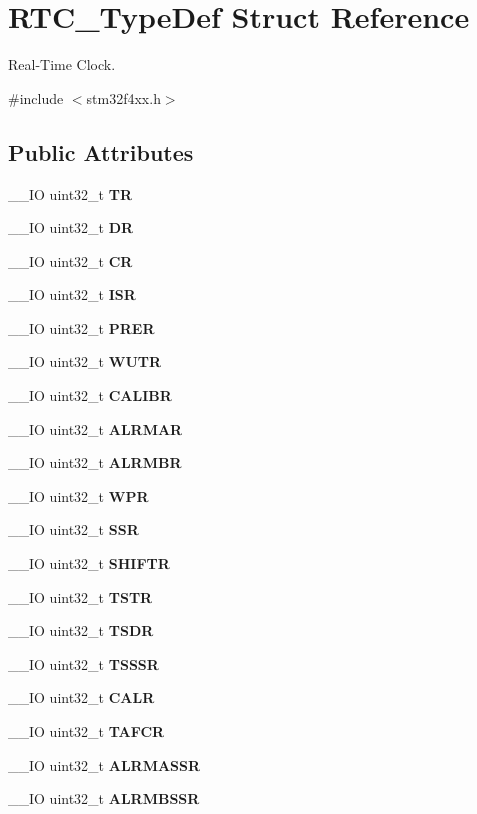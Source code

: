 \section{R\+T\+C\+\_\+\+Type\+Def Struct Reference}
\label{structRTC__TypeDef}


Real-\/\+Time Clock.  




{\ttfamily \#include $<$stm32f4xx.\+h$>$}

\subsection*{Public Attributes}
\begin{DoxyCompactItemize}
\item 
\+\_\+\+\_\+\+IO uint32\+\_\+t \textbf{ TR}
\item 
\+\_\+\+\_\+\+IO uint32\+\_\+t \textbf{ DR}
\item 
\+\_\+\+\_\+\+IO uint32\+\_\+t \textbf{ CR}
\item 
\+\_\+\+\_\+\+IO uint32\+\_\+t \textbf{ I\+SR}
\item 
\+\_\+\+\_\+\+IO uint32\+\_\+t \textbf{ P\+R\+ER}
\item 
\+\_\+\+\_\+\+IO uint32\+\_\+t \textbf{ W\+U\+TR}
\item 
\+\_\+\+\_\+\+IO uint32\+\_\+t \textbf{ C\+A\+L\+I\+BR}
\item 
\+\_\+\+\_\+\+IO uint32\+\_\+t \textbf{ A\+L\+R\+M\+AR}
\item 
\+\_\+\+\_\+\+IO uint32\+\_\+t \textbf{ A\+L\+R\+M\+BR}
\item 
\+\_\+\+\_\+\+IO uint32\+\_\+t \textbf{ W\+PR}
\item 
\+\_\+\+\_\+\+IO uint32\+\_\+t \textbf{ S\+SR}
\item 
\+\_\+\+\_\+\+IO uint32\+\_\+t \textbf{ S\+H\+I\+F\+TR}
\item 
\+\_\+\+\_\+\+IO uint32\+\_\+t \textbf{ T\+S\+TR}
\item 
\+\_\+\+\_\+\+IO uint32\+\_\+t \textbf{ T\+S\+DR}
\item 
\+\_\+\+\_\+\+IO uint32\+\_\+t \textbf{ T\+S\+S\+SR}
\item 
\+\_\+\+\_\+\+IO uint32\+\_\+t \textbf{ C\+A\+LR}
\item 
\+\_\+\+\_\+\+IO uint32\+\_\+t \textbf{ T\+A\+F\+CR}
\item 
\+\_\+\+\_\+\+IO uint32\+\_\+t \textbf{ A\+L\+R\+M\+A\+S\+SR}
\item 
\+\_\+\+\_\+\+IO uint32\+\_\+t \textbf{ A\+L\+R\+M\+B\+S\+SR}

\end{DoxyCompactItemize}
